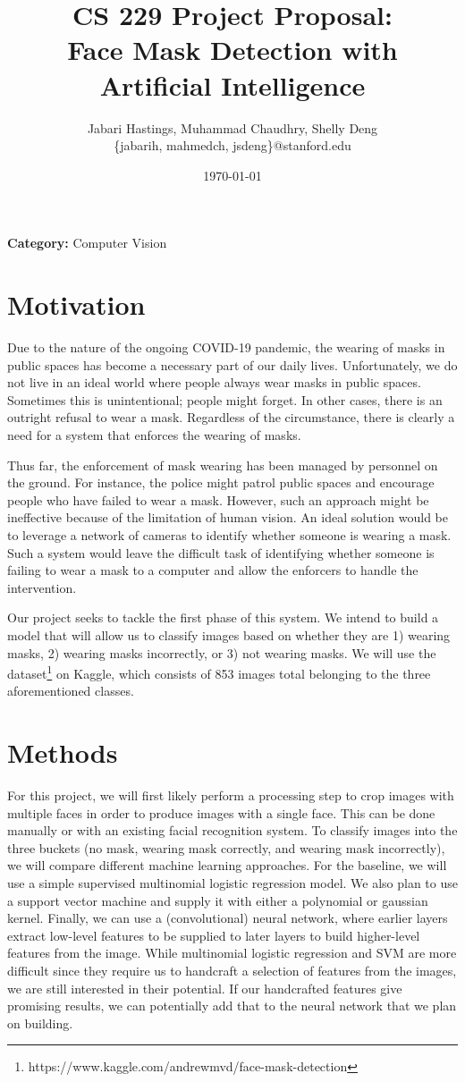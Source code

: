 \documentclass{article}
\title{CS 229 Project Proposal: \\Face Mask Detection with Artificial Intelligence}
\author{
Jabari Hastings, Muhammad Chaudhry, Shelly Deng \\
\{jabarih, mahmedch, jsdeng\}@stanford.edu
}
\date{\today}
\begin{document}
\maketitle
\noindent \textbf{Category:} Computer Vision

\section*{Motivation}

Due to the nature of the ongoing COVID-19 pandemic, the wearing of masks in public spaces has become a necessary part of our daily lives. Unfortunately, we do not live in an ideal world where people always wear masks in public spaces. Sometimes this is unintentional; people might forget. In other cases, there is an outright refusal to wear a mask. Regardless of the circumstance, there is clearly a need for a system that enforces the wearing of masks.

Thus far, the enforcement of mask wearing has been managed by personnel on the ground. For instance, the police might patrol public spaces and encourage people who have failed to wear a mask. However, such an approach might be ineffective because of the limitation of human vision. An ideal solution would be to leverage a network of cameras to identify whether someone is wearing a mask. Such a system would leave the difficult task of identifying whether someone is failing to wear a mask to a computer and allow the enforcers to handle the intervention. 

Our project seeks to tackle the first phase of this system. 
We intend to build a model that will allow us to classify images based on whether they are 1) wearing masks, 2) wearing masks incorrectly, or 3) not wearing masks. We will use the dataset\footnote{https://www.kaggle.com/andrewmvd/face-mask-detection} on Kaggle, which consists of 853 images total belonging to the three aforementioned classes. 

\section*{Methods}

For this project, we will first likely perform a processing step to crop images with multiple faces in order to produce images with a single face. This can be done manually or with an existing facial recognition system. To classify images into the three buckets (no mask, wearing mask correctly, and wearing mask incorrectly), we will compare different machine learning approaches. For the baseline, we will use a simple supervised multinomial logistic regression model. We also plan to use a support vector machine and supply it with either a polynomial or gaussian kernel. Finally, we can use a (convolutional) neural network, where earlier layers extract low-level features to be supplied to later layers to build higher-level features from the image. While multinomial logistic regression and SVM are more difficult since they require us to handcraft a selection of features from the images, we are still interested in their potential. If our handcrafted features give promising results, we can potentially add that to the neural network that we plan on building. 
\end{document}
